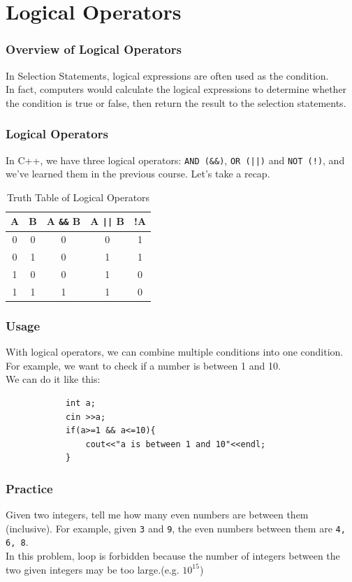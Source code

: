 \documentclass[xcolor=dvipsnames]{beamer}
\begin{document}
    \section{Logical Operators}
    \begin{frame}
        \frametitle{Overview of Logical Operators}
        In Selection Statements, logical expressions are often used as the condition.\\
        In fact, computers would calculate the logical expressions to determine whether the condition is true or false, then return the result to the selection statements.\\
    \end{frame}
    \begin{frame}
        \frametitle{Logical Operators}
        In C++, we have three logical operators: \texttt{AND (\&\&)}, \texttt{OR (||)} and \texttt{NOT (!)}, and we've learned them in the previous course. Let's take a recap.
        \begin{table}
            \centering
            \begin{tabular}{cc|c|c|c}
                \toprule
                A & B & A \texttt{\&\&} B & A \texttt{||} B & !A \\
                \midrule
                0 & 0 & 0 & 0 & 1 \\
                0 & 1 & 0 & 1 & 1 \\
                1 & 0 & 0 & 1 & 0 \\
                1 & 1 & 1 & 1 & 0 \\
                \bottomrule
            \end{tabular}
            \caption{Truth Table of Logical Operators}
        \end{table}
    \end{frame}
    \begin{frame}[fragile]
        \frametitle{Usage}
        With logical operators, we can combine multiple conditions into one condition.\\
        For example, we want to check if a number is between 1 and 10.\\
        We can do it like this:
        \begin{verbatim}
            int a;
            cin >>a;
            if(a>=1 && a<=10){
                cout<<"a is between 1 and 10"<<endl;
            }
        \end{verbatim}
    \end{frame}
    \begin{frame}
        \frametitle{Practice}
        Given two integers, tell me how many even numbers are between them (inclusive).
        For example, given \texttt{3} and \texttt{9}, the even numbers between them are \texttt{4, 6, 8}.\\
        In this problem, loop is forbidden because the number of integers between the two given integers may be too large.(e.g. $10^{15}$)
    \end{frame}
\end{document}
